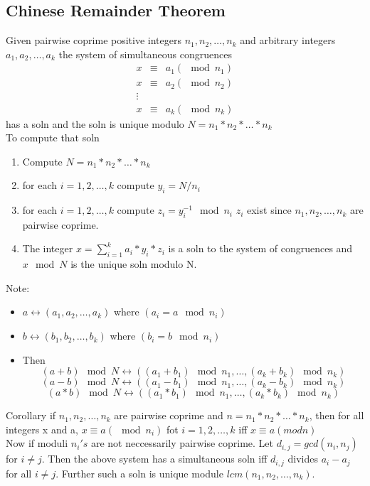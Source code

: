 \documentclass[8pt, a4paper, oneside, twocolumn]{extarticle}
\begin{document}
\subsection{Chinese Remainder Theorem}
Given pairwise coprime positive integers $n_1, n_2, \dots, n_k$ and arbitrary integers $a_1, a_2, \dots, a_k$ the system of simultaneous congruences \begin{eqnarray}
x & \equiv & a_1 (\mod n_1)\\
x & \equiv & a_2 (\mod n_2)\\
\vdots\\
x & \equiv & a_k (\mod n_k)
\end{eqnarray}
has a soln and the soln is unique modulo $N = n_1 * n_2 *\dots*n_k$
\\To compute that soln
\begin{enumerate}
    \item Compute $N = n_1 * n_2 * \dots * n_k$
    \item for each $i = 1, 2, \dots, k$ compute $y_i = N/n_i$
    \item for each $i = 1, 2, \dots, k$ compute $z_i = y_{i}^{-1} \mod n_i$ $z_i$ exist since $n_1, n_2, \dots, n_k$ are pairwise coprime.
    \item The integer $x = \sum_{i = 1}^k a_i * y_i * z_i$ is a soln to the system of congruences and $x \mod N$ is the unique soln modulo N.
\end{enumerate}
Note:
\begin{itemize}
    \item $a \leftrightarrow (a_1, a_2, \dots, a_k)$ where $(a_i = a \mod n_i)$
    \item $b \leftrightarrow (b_1, b_2, \dots, b_k)$ where $(b_i = b \mod n_i)$
    \item Then
    $$(a+b) \mod N \leftrightarrow ((a_1 + b_1) \mod n_1, \dots, (a_k + b_k) \mod n_k)$$ 
    $$(a-b) \mod N \leftrightarrow ((a_1 - b_1) \mod n_1, \dots, (a_k - b_k) \mod n_k)$$
    $$(a*b) \mod N \leftrightarrow ((a_1 * b_1) \mod n_1, \dots, (a_k * b_k) \mod n_k)$$
\end{itemize}
Corollary if $n_1, n_2, \dots, n_k$ are pairwise coprime and $n = n_1*n_2*\dots * n_k$, then for all integers x and a, $x \equiv a (\mod n_i)$ fot $i = 1, 2, \dots, k$ iff $x \equiv a (mod n)$
\\Now if moduli $n_i's$ are not neccessarily pairwise coprime. Let $d_{i, j} = gcd(n_i, n_j)$ for $i \neq j$. Then the above system has a simultaneous soln iff $d_{i, j}$ divides $a_i - a_j$ for all $i \neq j$. Further such a soln is unique module $lcm(n_1, n_2, \dots, n_k)$.
\end{document}

